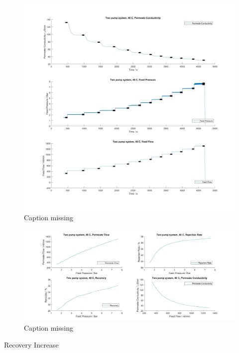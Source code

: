 \begin{figure}[H]
    \centering
    \includegraphics[width=1.1\textwidth]{FeedPumpIncrease40}
    \caption{Caption missing}
    \label{fig:PressConn}
\end{figure}


\begin{figure}[H]
    \centering
    \includegraphics[width=1.1\textwidth]{FeedPumpIncrease40Key}
    \caption{Caption missing}
    \label{fig:PressConn}
\end{figure}

Recovery Increase

